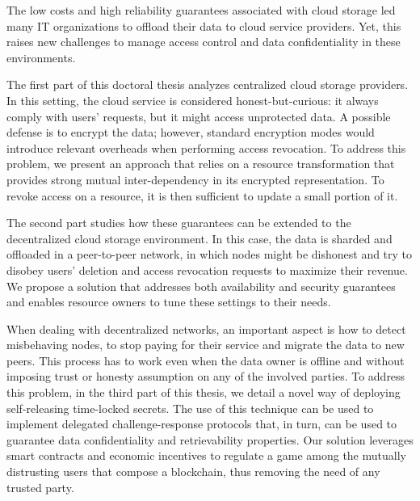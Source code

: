 The low costs and high reliability guarantees associated with cloud storage led many IT organizations to offload their data to cloud service providers. Yet, this raises new challenges to manage access control and data confidentiality in these environments.

The first part of this doctoral thesis analyzes centralized cloud storage providers. In this setting, the cloud service is considered honest-but-curious: it always comply with users' requests, but it might access unprotected data. A possible defense is to encrypt the data; however, standard encryption modes would introduce relevant overheads when performing access revocation. To address this problem, we present an approach that relies on a resource transformation that provides strong mutual inter-dependency in its encrypted representation. To revoke access on a resource, it is then sufficient to update a small portion of it.

The second part studies how these guarantees can be extended to the decentralized cloud storage environment. In this case, the data is sharded and offloaded in a peer-to-peer network, in which nodes might be dishonest and try to disobey users' deletion and access revocation requests to maximize their revenue. We propose a solution that addresses both availability and security guarantees and enables resource owners to tune these settings to their needs.

When dealing with decentralized networks, an important aspect is how to detect misbehaving nodes, to stop paying for their service and migrate the data to new peers. This process has to work even when the data owner is offline and without imposing trust or honesty assumption on any of the involved parties. To address this problem, in the third part of this thesis, we detail a novel way of deploying self-releasing time-locked secrets. The use of this technique can be used to implement delegated challenge-response protocols that, in turn, can be used to guarantee data confidentiality and retrievability properties. Our solution leverages smart contracts and economic incentives to regulate a game among the mutually distrusting users that compose a blockchain, thus removing the need of any trusted party.
